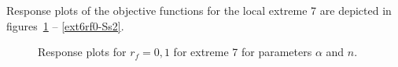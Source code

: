 \documentclass[review,times,3p,10pt]{elsarticle}
\begin{document}
Response plots of the objective functions for the local extreme 7 are depicted in figures~\ref{ext6rf0-an2} -- \ref{ext6rf0-Ss2}.

\begin{figure}[htb!]
\label{ext6rf0-an2}
\caption{Response plots for $r_f=0,1$ for extreme 7 for parameters $\alpha$ and $n$.}
\end{figure}
\end{document}
